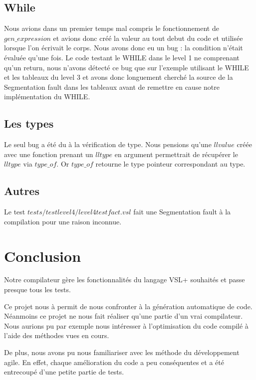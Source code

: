 \documentclass[10pt,a4paper]{article}
\begin{document}
\subsection{While}

Nous avions dans un premier temps mal compris le fonctionnement de $gen\_expression$ et avions donc cr\'e\'e la valeur au tout debut du code et utilis\'ee lorsque l'on \'ecrivait le corps. Nous avons donc eu un bug : la condition n'\'etait \'evalu\'ee qu'une fois. Le code testant le WHILE dans le level 1 ne comprenant qu'un return, nous n'avons d\'etect\'e ce bug que sur l'exemple utilisant le WHILE et les tableaux du level 3 et avons donc longuement cherch\'e la source de la Segmentation fault dans les tableaux avant de remettre en cause notre impl\'ementation du WHILE. 

\subsection{Les types} 

Le seul bug a \'et\'e du \`a la v\'erification de type. Nous pensions qu'une $llvalue$ cr\'e\'ee avec une fonction prenant un $lltype$ en argument permettrait de r\'ecup\'erer le $lltype$ via $type\_of$. Or $type\_of$ retourne le type pointeur correspondant au type.

\subsection{Autres}

Le test $tests/testlevel4/level4testfact.vsl$ fait une Segmentation fault \`a la compilation pour une raison inconnue.

\section{Conclusion}

Notre compilateur gère les fonctionnalités du langage VSL+ souhaités et passe presque tous les tests.

Ce projet nous à permit de nous confronter à la génération automatique de code. 
Néanmoins ce projet ne nous fait réaliser qu'une partie d'un vrai compilateur. Nous aurions pu par exemple nous intéresser à l'optimisation du code compilé à l'aide des méthodes vues en cours.

De plus, nous avons pu nous familiariser avec les méthode du développement agile. En effet, chaque amélioration du code a peu conséquentes et a été entrecoupé d'une petite partie de tests.
\end{document}
